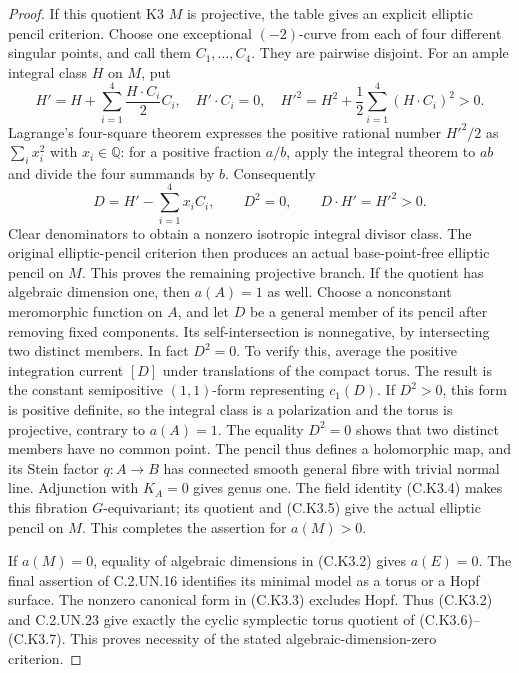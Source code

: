 \begin{proof}
If this quotient K3 $M$ is projective, the table gives
an explicit elliptic pencil criterion. Choose one
exceptional $(-2)$-curve from each of four different
singular points, and call them $C_1,\ldots,C_4$.
They are pairwise disjoint. For an ample integral
class $H$ on $M$, put
\[
 H'=H+\sum_{i=1}^4\frac{H\cdot C_i}{2}C_i,
 \quad H'\cdot C_i=0,
 \quad H'^2=H^2+\frac12\sum_{i=1}^4(H\cdot C_i)^2>0.
                                                               \tag{C.K3.8}
\]
Lagrange's four-square theorem
\cite[Theorem~II, Corollary~II]{Lagrange1770}
expresses the positive rational number $H'^2/2$ as
$\sum_i x_i^2$ with $x_i\in\mathbb Q$: for a
positive fraction $a/b$, apply the integral theorem
to $ab$ and divide the four summands by $b$.
Consequently
\[
 D=H'-\sum_{i=1}^4x_iC_i,
 \qquad D^2=0,
 \qquad D\cdot H'=H'^2>0.
                                                               \tag{C.K3.9}
\]
Clear denominators to obtain a nonzero isotropic
integral divisor class. The original elliptic-pencil
criterion \cite[\S3, Corollary~3, with the reflection
argument of \S6]{PiatetskiShapiroShafarevich1971}
then produces an actual base-point-free elliptic
pencil on $M$. This proves the remaining projective
branch. If the quotient has algebraic dimension
one, then $a(A)=1$ as well. Choose a nonconstant
meromorphic function on $A$, and let $D$ be a
general member of its pencil after removing fixed
components. Its self-intersection is nonnegative,
by intersecting two distinct members. In fact
$D^2=0$. To verify this, average the positive
integration current $[D]$ under translations of
the compact torus. The result is the constant
semipositive $(1,1)$-form representing $c_1(D)$.
If $D^2>0$, this form is positive definite, so
the integral class is a polarization and the
torus is projective, contrary to $a(A)=1$.
The equality $D^2=0$ shows that two distinct
members have no common point. The pencil thus
defines a holomorphic map, and its Stein factor
$q:A\to B$ has connected smooth general fibre
with trivial normal line. Adjunction with
$K_A=0$ gives genus one. The field identity
(C.K3.4) makes this fibration $G$-equivariant;
its quotient and (C.K3.5) give the actual
elliptic pencil on $M$. This completes the
assertion for $a(M)>0$.

If $a(M)=0$, equality of algebraic dimensions in
(C.K3.2) gives $a(E)=0$. The final assertion of
C.2.UN.16 identifies its minimal model as a torus
or a Hopf surface. The nonzero canonical form
in (C.K3.3) excludes Hopf. Thus (C.K3.2) and
C.2.UN.23 give exactly the cyclic symplectic torus
quotient of (C.K3.6)--(C.K3.7). This proves necessity
of the stated algebraic-dimension-zero criterion.


\end{proof}
